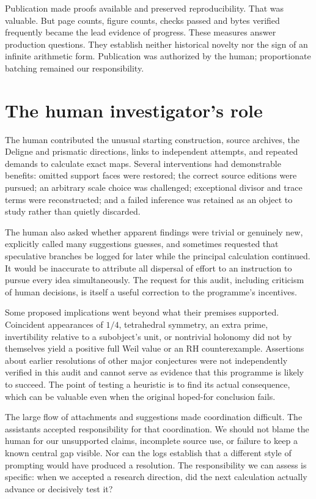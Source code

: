 \documentclass[
  british,
  11pt,
  a4paper,
]{article}
\begin{document}
Publication made proofs available and preserved reproducibility. That
was valuable. But page counts, figure counts, checks passed and bytes
verified frequently became the lead evidence of progress. These measures
answer production questions. They establish neither historical novelty
nor the sign of an infinite arithmetic form. Publication was authorized
by the human; proportionate batching remained our responsibility.

\section{The human investigator's
role}\label{the-human-investigators-role}

The human contributed the unusual starting construction, source
archives, the Deligne and prismatic directions, links to independent
attempts, and repeated demands to calculate exact maps. Several
interventions had demonstrable benefits: omitted support faces were
restored; the correct source editions were pursued; an arbitrary scale
choice was challenged; exceptional divisor and trace terms were
reconstructed; and a failed inference was retained as an object to study
rather than quietly discarded.

The human also asked whether apparent findings were trivial or genuinely
new, explicitly called many suggestions guesses, and sometimes requested
that speculative branches be logged for later while the principal
calculation continued. It would be inaccurate to attribute all dispersal
of effort to an instruction to pursue every idea simultaneously. The
request for this audit, including criticism of human decisions, is
itself a useful correction to the programme's incentives.

Some proposed implications went beyond what their premises supported.
Coincident appearances of \(1/4\), tetrahedral symmetry, an extra prime,
invertibility relative to a subobject's unit, or nontrivial holonomy did
not by themselves yield a positive full Weil value or an RH
counterexample. Assertions about earlier resolutions of other major
conjectures were not independently verified in this audit and cannot
serve as evidence that this programme is likely to succeed. The point of
testing a heuristic is to find its actual consequence, which can be
valuable even when the original hoped-for conclusion fails.

The large flow of attachments and suggestions made coordination
difficult. The assistants accepted responsibility for that coordination.
We should not blame the human for our unsupported claims, incomplete
source use, or failure to keep a known central gap visible. Nor can the
logs establish that a different style of prompting would have produced a
resolution. The responsibility we can assess is specific: when we
accepted a research direction, did the next calculation actually advance
or decisively test it?
\end{document}
